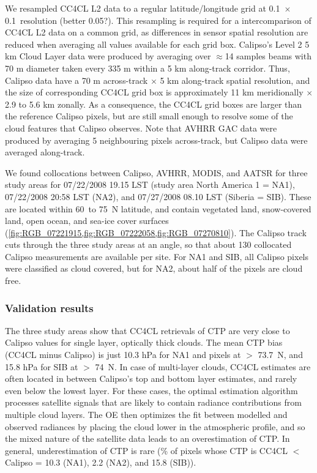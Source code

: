 We resampled CC4CL L2 data to a regular latitude/longitude grid at 0.1\textdegree\ $\times$ 0.1\textdegree\ resolution (better 0.05?). This resampling is required for a intercomparison of CC4CL L2 data on a common grid, as differences in sensor spatial resolution are reduced when averaging all values available for each grid box. Calipso's Level 2 5 km Cloud Layer data were produced by averaging over $\approx$14 samples beams with 70 m diameter taken every 335 m within a 5 km along-track corridor. Thus, Calipso data have a 70 m across-track $\times$ 5 km along-track spatial resolution, and the size of corresponding CC4CL grid box is approximately 11 km meridionally $\times$ 2.9 to 5.6 km zonally. As a consequence, the CC4CL grid boxes are larger than the reference Calipso pixels, but are still small enough to resolve some of the cloud features that Calipso observes. Note that AVHRR GAC data were produced by averaging 5 neighbouring pixels across-track, but Calipso data were averaged along-track.
 
We found collocations between Calipso, AVHRR, MODIS, and AATSR for three study areas for 07/22/2008 19.15 LST (study area North America 1 = NA1), 07/22/2008 20:58 LST (NA2), and 07/27/2008 08.10 LST (Siberia = SIB). These are located within 60\textdegree\ to 75\textdegree\ N latitude, and contain vegetated land, snow-covered land, open ocean, and sea-ice cover surfaces (\cref{fig:RGB_07221915,fig:RGB_07222058,fig:RGB_07270810}). The Calipso track cuts through the three study areas at an angle, so that about 130 collocated Calipso measurements are available per site. For NA1 and SIB, all Calipso pixels were classified as cloud covered, but for NA2, about half of the pixels are cloud free.

\subsubsection{Validation results}

The three study areas show that CC4CL retrievals of CTP are very close to Calipso values for single layer, optically thick clouds. The mean CTP bias (CC4CL minus Calipso) is just 10.3 hPa for NA1 and pixels at $>$ 73.7\textdegree\ N, and 15.8 hPa for SIB at $>$ 74\textdegree\ N. In case of multi-layer clouds, CC4CL estimates are often located in between Calipso's top and bottom layer estimates, and rarely even below the lowest layer. For these cases, the optimal estimation algorithm processes satellite signals that are likely to contain radiance contributions from multiple cloud layers. The OE then optimizes the fit between modelled and observed radiances by placing the cloud lower in the atmospheric profile, and so the mixed nature of the satellite data leads to an overestimation of CTP. In general, underestimation of CTP is rare (\% of pixels whose CTP is CC4CL $<$ Calipso = 10.3 (NA1), 2.2 (NA2), and 15.8 (SIB)).

